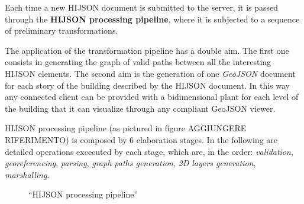 \documentclass{sig-alternate}
\begin{document}
Each time a new HIJSON document is submitted to the server, it is passed
through the \textbf{HIJSON processing pipeline}, where it is subjected
to a sequence of preliminary transformations.

The application of the transformation pipeline has a double aim. The
first one consists in generating the graph of valid paths between all
the interesting HIJSON elements. The second aim is the generation of one
\emph{GeoJSON} document for each story of the building described by the
HIJSON document. In this way any connected client can be provided with a
bidimensional plant for each level of the building that it can visualize
through any compliant GeoJSON viewer.

HIJSON processing pipeline (as pictured in figure AGGIUNGERE
RIFERIMENTO) is composed by 6 elaboration stages. In the following are
detailed operations excecuted by each stage, which are, in the order:
\emph{validation}, \emph{georeferencing}, \emph{parsing}, \emph{graph
paths generation}, \emph{2D layers generation}, \emph{marshalling}.

\begin{figure}[!htbp]
\centering
{}
\caption{``HIJSON processing pipeline''}
\label{fig:pipeline}
\end{figure}
\end{document}

